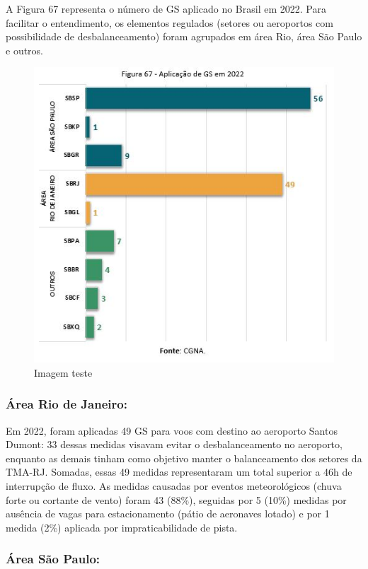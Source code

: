 \documentclass[
]{book}
\begin{document}
A Figura 67 representa o número de GS aplicado no Brasil em 2022. Para facilitar o entendimento, os elementos regulados (setores ou aeroportos com possibilidade de desbalanceamento) foram agrupados em área Rio, área São Paulo e outros.

\begin{figure}
\centering
\includegraphics{imagens/fig56.jpg}
\caption{Imagem teste}
\end{figure}

\hypertarget{uxe1rea-rio-de-janeiro}{%
\subsubsection{Área Rio de Janeiro:}\label{uxe1rea-rio-de-janeiro}}

Em 2022, foram aplicadas 49 GS para voos com destino ao aeroporto Santos Dumont: 33 dessas medidas visavam evitar o desbalanceamento no aeroporto, enquanto as demais tinham como objetivo manter o balanceamento dos setores da TMA-RJ. Somadas, essas 49 medidas representaram um total superior a 46h de interrupção de fluxo. As medidas causadas por eventos meteorológicos (chuva forte ou cortante de vento) foram 43 (88\%), seguidas por 5 (10\%) medidas por ausência de vagas para estacionamento (pátio de aeronaves lotado) e por 1 medida (2\%) aplicada por impraticabilidade de pista.

\hypertarget{uxe1rea-suxe3o-paulo}{%
\subsubsection{Área São Paulo:}\label{uxe1rea-suxe3o-paulo}}
\end{document}
